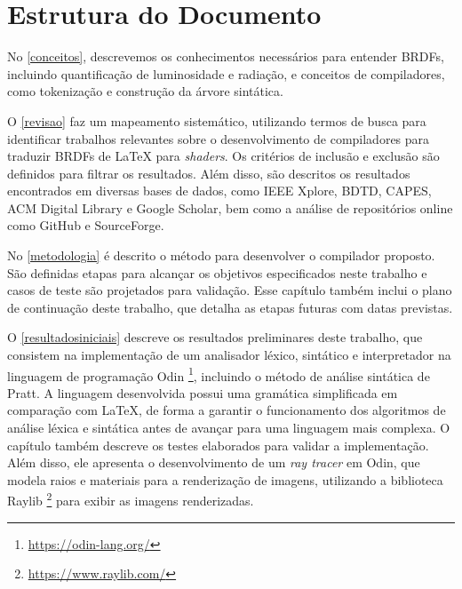 \documentclass[english,
               brazil,
               bsc] %
               {dcomp-abntex2}
\begin{document}
\section{Estrutura do Documento}
No \autoref{conceitos}, descrevemos os conhecimentos necessários para entender BRDFs, incluindo quantificação de luminosidade e radiação, e  conceitos de compiladores, como tokenização e construção da árvore sintática.


O \autoref{revisao} faz um mapeamento sistemático, utilizando termos de busca para identificar trabalhos relevantes sobre o desenvolvimento de compiladores para traduzir BRDFs de \LaTeX{}  para \textit{shaders}. Os critérios de inclusão e exclusão são definidos para filtrar os resultados. Além disso, são descritos os resultados encontrados em diversas bases de dados, como IEEE Xplore, BDTD, CAPES, ACM Digital Library e Google Scholar, bem como a análise de repositórios online como GitHub e SourceForge. 


No \autoref{metodologia} é descrito o método para desenvolver o compilador proposto. São definidas etapas para alcançar os objetivos especificados neste trabalho e casos de teste são projetados para validação. Esse capítulo também inclui o plano de continuação deste trabalho, que detalha as etapas futuras com datas previstas.




O \autoref{resultadosiniciais} descreve os resultados preliminares deste trabalho, que consistem na implementação de um analisador léxico, sintático e interpretador na linguagem de programação Odin \footnote{\url{https://odin-lang.org/}}, incluindo o método de análise sintática de Pratt. A linguagem desenvolvida possui uma gramática simplificada em comparação com \LaTeX{}, de forma a garantir o funcionamento dos algoritmos de análise léxica e sintática antes de avançar para uma linguagem mais complexa. O capítulo também descreve os testes elaborados para validar a implementação. Além disso, ele apresenta o desenvolvimento de um \textit{ray tracer} em Odin, que modela raios e materiais para a renderização de imagens, utilizando a biblioteca Raylib \footnote{\url{https://www.raylib.com/}} para exibir as imagens renderizadas.













\end{document}

